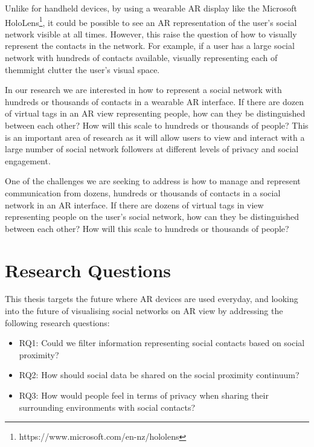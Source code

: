 Unlike for handheld devices, by using a wearable AR display like the Microsoft HoloLens\footnote{https://www.microsoft.com/en-nz/hololens}, it could be possible to see an AR representation of the user's social network visible at all times. However, this raise the question of how to visually represent the contacts in the network. For example, if a user has a large social network with hundreds of contacts available, visually representing each of themmight clutter the user's visual space.

In our research we are interested in how to represent a social network with hundreds or thousands of contacts in a wearable AR interface. If there are dozen of virtual tags in an AR view representing people, how can they be distinguished between each other? How will this scale to hundreds or thousands of people? This is an important area of research as it will allow users to view and interact with a large number of social network followers at different levels of privacy and social engagement.

One of the challenges we are seeking to address is how to manage and represent communication from dozens, hundreds or thousands of contacts in a social network in an AR interface. If there are dozens of virtual tags in view representing people on the user's social network, how can they be distinguished between each other? How will this scale to hundreds or thousands of people?

\section{Research Questions}

This thesis targets the future where AR devices are used everyday, and looking into the future of visualising social networks on AR view by addressing the following research questions: 

\begin{itemize}
    \item RQ1: Could we filter information representing social contacts based on social proximity?
    \item RQ2: How should social data be shared on the social proximity continuum?
    \item RQ3: How would people feel in terms of privacy when sharing their surrounding environments with social contacts?
\end{itemize}


